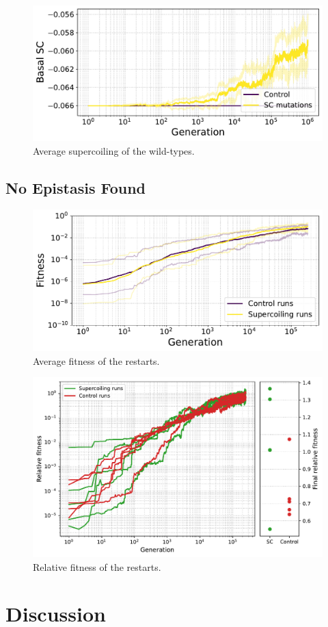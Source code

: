 \begin{figure}
\includegraphics[width=\textwidth]{continuous/img/basal_sc_all.pdf}
\caption{Average supercoiling of the wild-types.}
\label{fig:continuous:wt-sc}
\end{figure}

\subsection{No Epistasis Found}

\begin{figure}
\includegraphics[width=\textwidth]{continuous/img/fitness_grouped.pdf}
\caption{Average fitness of the restarts.}
\label{fig:continuous:restart-fitness}
\end{figure}

\begin{figure}
\includegraphics[width=\textwidth]{continuous/img/rel_fitness_sc_control.pdf}
\caption{Relative fitness of the restarts.}
\label{fig:continuous:restart-rel-fitness}
\end{figure}


\section{Discussion}

